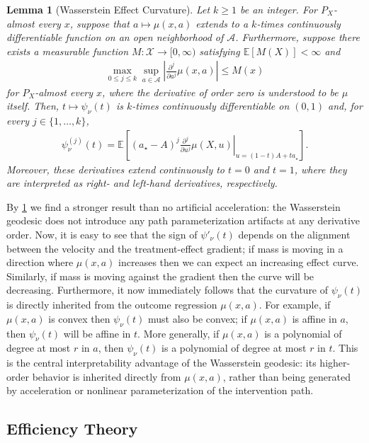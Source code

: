 \documentclass[11pt,twoside]{article}
\newtheorem{lemma}{Lemma}
\theoremstyle{definition}
\theoremstyle{remark}
\begin{document}
\begin{lemma}[Wasserstein Effect Curvature] \label{effect_curvature}
Let $k \geq 1$ be an integer. For $P_X$-almost every $x$, suppose that $a \mapsto \mu(x,a)$ extends to a $k$-times continuously differentiable function on an open neighborhood of $\mathcal{A}$. Furthermore, suppose there exists a measurable function $M:\mathcal{X}\to[0,\infty)$ satisfying $\mathbb{E}[M(X)]<\infty$ and
\begin{align*}
    \max_{0\leq j\leq k} \sup_{a\in\mathcal{A}} \left| \frac{\partial^j}{\partial a^j} \mu(x,a) \right| \leq M(x)
\end{align*}
for $P_X$-almost every $x$, where the derivative of order zero is understood to be $\mu$ itself. Then, $t\mapsto\psi_\nu(t)$ is $k$-times continuously
differentiable on $(0,1)$ and, for every
$j\in\{1,\ldots,k\}$,
\begin{align*}
    \psi_\nu^{(j)}(t) = \mathbb{E} \! \left[ (a_\star-A)^j \left. \frac{\partial^j}{\partial u^j} \mu(X,u) \right|_{ u=(1-t)A+ta_\star} \right].
\end{align*}
Moreover, these derivatives extend continuously to
$t=0$ and $t=1$, where they are interpreted as right- and
left-hand derivatives, respectively.
\end{lemma}

By \cref{effect_curvature} we find a stronger result than no artificial acceleration: the Wasserstein geodesic does not introduce any path parameterization artifacts at any derivative order. Now, it is easy to see that the sign of $\psi'_\nu(t)$ depends on the alignment between the velocity and the treatment-effect gradient; if mass is moving in a direction where $\mu(x, a)$ increases then we can expect an increasing effect curve. Similarly, if mass is moving against the gradient then the curve will be decreasing. Furthermore, it now immediately follows that the curvature of $\psi_\nu(t)$ is directly inherited from the outcome regression $\mu(x, a)$. For example, if $\mu(x, a)$ is convex then $\psi_\nu(t)$ must also be convex; if $\mu(x, a)$ is affine in $a$, then $\psi_\nu(t)$ will be affine in $t$. More generally, if $\mu(x, a)$ is a polynomial of degree at most $r$ in $a$, then $\psi_\nu(t)$ is a polynomial of degree at most $r$ in $t$. This is the central interpretability advantage of the Wasserstein geodesic: its higher-order behavior is inherited directly from $\mu(x, a)$, rather than being generated by acceleration or nonlinear parameterization of the intervention path.

\subsection{Efficiency Theory} \label{efficiency_theory_section}
\end{document}
